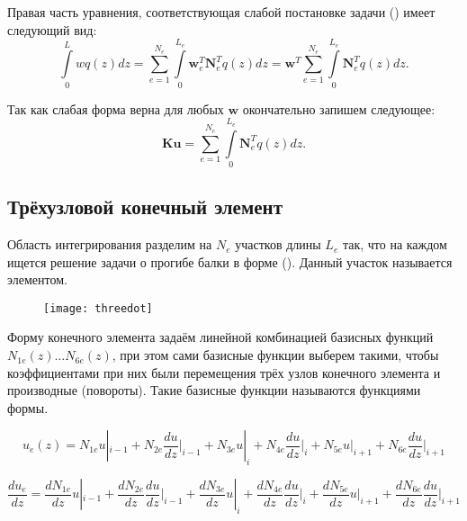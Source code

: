 \documentclass[12pt,a4paper]{article}
\begin{document}
Правая часть уравнения, соответствующая слабой постановке задачи () имеет следующий вид:
$$\int\limits_{0}^{L}wq(z)dz=\sum\limits_{e=1}^{N_e}\int\limits_{0}^{L_e}\textbf{w}_e^{T}\textbf{N}^T_e q(z)dz=\textbf{w}^{T}\sum\limits_{e=1}^{N_e} \int\limits_{0}^{L_e}\textbf{N}_e^{T}q(z)dz.$$

Так как слабая форма верна для любых $\textbf{w}$  окончательно запишем следующее:
 $$\textbf{Ku}=\sum\limits_{e=1}^{N_e}\int\limits_{0}^{L_e}\textbf{N}_{e}^{T}q(z)dz.$$


\subsection{Трёхузловой конечный элемент}

Область интегрирования разделим на $N_e$ участков длины  $L_e$ так, что на каждом ищется решение задачи о прогибе балки в форме (). Данный участок называется элементом.

\begin{figure}[H]
		\centering
		\texttt{[image: threedot]}
		\caption{}
		\label{fig:threedot}
	\end{figure}

Форму конечного элемента задаём линейной комбинацией базисных функций \\
$N_{1e}(z)\ldots N_{6e}(z)$, при этом сами базисные функции выберем такими, чтобы коэффициентами при них были перемещения трёх узлов конечного элемента и производные (повороты). Такие базисные функции называются функциями формы. 

\begin{equation}
	u_e(z)=N_{1e}u|_{i-1}+N_{2e}\frac{du}{dz}\Bigr|_{i-1}+N_{3e}u|_{i}+N_{4e}\frac{du}{dz}\Bigr|_{i}+N_{5e}u|_{i+1}+N_{6e}\frac{du}{dz}\Bigr|_{i+1}
	\label{beamthree1}
	\end{equation} 
	
	\begin{equation}
\frac{du_e}{dz}=\frac{dN_{1e}}{dz}u|_{i-1}+\frac{dN_{2e}}{dz}\frac{du}{dz}\Bigr|_{i-1}+\frac{dN_{3e}}{dz}u|_{i}+\frac{dN_{4e}}{dz}\frac{du}{dz}\Bigr|_{i}+\frac{dN_{5e}}{dz}u|_{i+1}+\frac{dN_{6e}}{dz}\frac{du}{dz}\Bigr|_{i+1}
	\label{beamthree2}
	\end{equation} 
	
\end{document}
